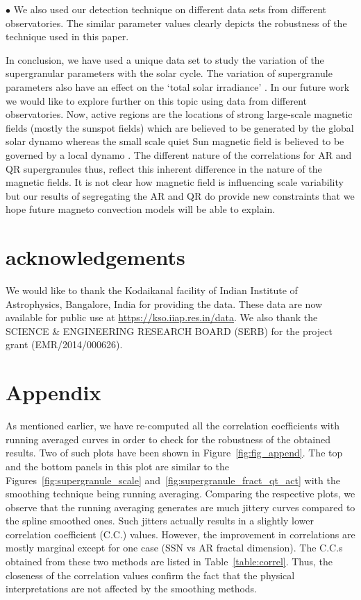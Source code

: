 \documentclass[manuscript]{aastex}	%
\begin{document}
$\bullet$ We also used our detection technique on different data sets from different observatories. The similar parameter values clearly depicts the robustness of the technique used in this paper.

In conclusion, we have used a unique data set to study the variation of the supergranular parameters with the solar cycle. The variation of  supergranule parameters also have an effect on the `total solar irradiance' \citep{2041-8205-730-1-L3}. In our future work we would like to explore further on this topic using data from different observatories. Now, active regions are the locations of strong large-scale magnetic fields (mostly the sunspot fields) which are believed to be generated by the global solar dynamo \citep{lrsp-2010-3} whereas the small scale quiet Sun magnetic field is believed to be governed by a local dynamo \citep{2012A&A...547A..93S}. The different nature of the correlations for AR and QR supergranules thus, reflect this inherent difference in the nature of the magnetic fields.  It is not clear how magnetic field is influencing scale variability but our results of segregating the AR and QR do provide new constraints that we hope future magneto convection models will be able to explain. 


  \section{acknowledgements}
  We would like to thank the Kodaikanal facility of Indian Institute of Astrophysics, Bangalore, India for providing the data. These data are now available for public use at  \url{https://kso.iiap.res.in/data}.  We also thank the SCIENCE \& ENGINEERING RESEARCH BOARD (SERB) for the project grant (EMR/2014/000626).  
 
  \section{Appendix} \label{sec:append}
  
  As mentioned earlier, we have re-computed all the correlation coefficients with running averaged curves in order to check for the robustness of the obtained results. Two of such plots have been shown in Figure~\ref{fig:fig_append}. The top and the bottom panels in this plot are similar to the 
Figures{~\ref{fig:supergranule_scale} and~\ref{fig:supergranule_fract_qt_act}} with the smoothing technique being running averaging. Comparing the respective plots, we observe that the running averaging generates are much jittery curves compared to the spline smoothed ones. Such jitters actually results in a slightly lower correlation coefficient (C.C.) values. However, the improvement in correlations are mostly marginal except for one case (SSN vs AR fractal dimension). The C.C.s obtained from these two methods are listed in Table~\ref{table:correl}. Thus, the closeness of the correlation values confirm the fact that the physical interpretations are not affected by the smoothing methods.
  
\end{document}
